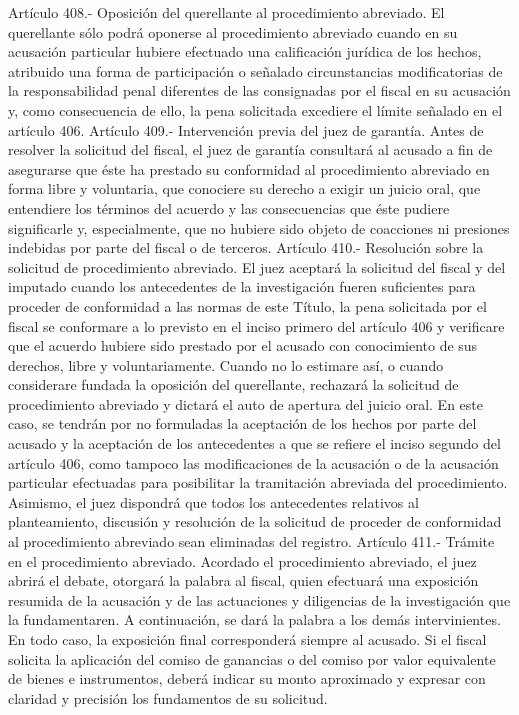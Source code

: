     Artículo 408.- Oposición del querellante al procedimiento abreviado. El querellante sólo podrá oponerse al procedimiento abreviado cuando en su acusación particular hubiere efectuado una calificación jurídica de los hechos, atribuido una forma de participación o señalado circunstancias modificatorias de la responsabilidad penal diferentes de las consignadas por el fiscal en su acusación y, como consecuencia de ello, la pena solicitada excediere el límite señalado en el artículo 406.
    Artículo 409.- Intervención previa del juez de garantía. Antes de resolver la solicitud del fiscal, el juez de garantía consultará al acusado a fin de asegurarse que éste ha prestado su conformidad al procedimiento abreviado en forma libre y voluntaria, que conociere su derecho a exigir un juicio oral, que entendiere los términos del acuerdo y las consecuencias que éste pudiere significarle y, especialmente, que no hubiere sido objeto de coacciones ni presiones indebidas por parte del fiscal o de terceros.
    Artículo 410.- Resolución sobre la solicitud de procedimiento abreviado. El juez aceptará la solicitud del fiscal y del imputado cuando los antecedentes de la investigación fueren suficientes para proceder de conformidad a las normas de este Título, la pena solicitada por el fiscal se conformare a lo previsto en el inciso primero del artículo 406 y verificare que el acuerdo hubiere sido prestado por el acusado con conocimiento de sus derechos, libre y voluntariamente.
    Cuando no lo estimare así, o cuando considerare fundada la oposición del querellante, rechazará la solicitud de procedimiento abreviado y dictará el auto de apertura del juicio oral. En este caso, se tendrán por no formuladas la aceptación de los hechos por parte del acusado y la aceptación de los antecedentes a que se refiere el inciso segundo del artículo 406, como tampoco las modificaciones de la acusación o de la acusación particular efectuadas para posibilitar la tramitación abreviada del procedimiento. Asimismo, el juez dispondrá que todos los antecedentes relativos al planteamiento, discusión y resolución de la solicitud de proceder de conformidad al procedimiento abreviado sean eliminadas del registro.
    Artículo 411.- Trámite en el procedimiento abreviado. Acordado el procedimiento abreviado, el juez abrirá el debate, otorgará la palabra al fiscal, quien efectuará una exposición resumida de la acusación y de las actuaciones y diligencias de la investigación que la fundamentaren. A continuación, se dará la palabra a los demás intervinientes. En todo caso, la exposición final corresponderá siempre al acusado.
    Si el fiscal solicita la aplicación del comiso de ganancias o del comiso por valor equivalente de bienes e instrumentos, deberá indicar su monto aproximado y expresar con claridad y precisión los fundamentos de su solicitud.

